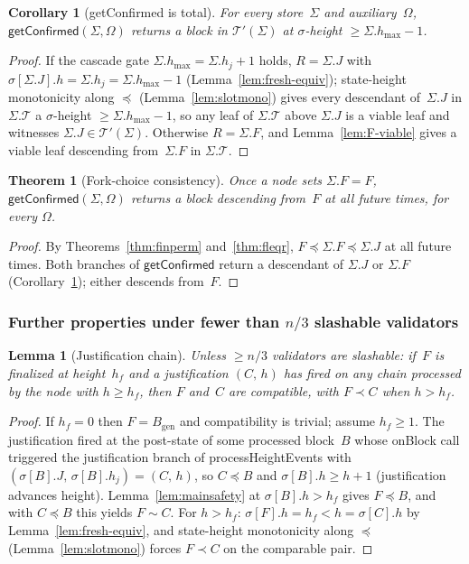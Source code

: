 \documentclass{article}
\newcommand{\genesis}{\ensuremath{B_{\mathrm{gen}}}}
\newcommand{\T}[0]{\ensuremath{\mathcal{T}}}
\newcommand{\hmax}{\ensuremath{h_{\max}}\xspace}
\newcommand{\viableTree}{\ensuremath{\mathcal{T}'}}
\newcommand{\processHeightEvents}{\textsf{processHeightEvents}\xspace}
\newcommand{\onBlock}{\textsf{onBlock}\xspace}
\newcommand{\getConfirmed}{\textsf{getConfirmed}\xspace}
\theoremstyle{plain}
\newtheorem{theorem}{Theorem}
\newtheorem{corollary}{Corollary}
\newtheorem{lemma}{Lemma}
\theoremstyle{definition}
\theoremstyle{remark}
\begin{document}
\begin{corollary}[\getConfirmed is total]\label{cor:getConfirmed-total}
For every store~$\Sigma$ and auxiliary~$\Omega$, $\getConfirmed(\Sigma, \Omega)$ returns a block in $\viableTree(\Sigma)$ at $\sigma$-height $\geq \Sigma.\hmax - 1$.
\end{corollary}

\begin{proof}
If the cascade gate $\Sigma.\hmax = \Sigma.h_j + 1$ holds, $R = \Sigma.J$ with $\sigma[\Sigma.J].h = \Sigma.h_j = \Sigma.\hmax - 1$ (Lemma~\ref{lem:fresh-equiv}); state-height monotonicity along $\preceq$ (Lemma~\ref{lem:slotmono}) gives every descendant of~$\Sigma.J$ in $\Sigma.\T$ a $\sigma$-height $\geq \Sigma.\hmax - 1$, so any leaf of $\Sigma.\T$ above $\Sigma.J$ is a viable leaf and witnesses $\Sigma.J \in \viableTree(\Sigma)$.
Otherwise $R = \Sigma.F$, and Lemma~\ref{lem:F-viable} gives a viable leaf descending from~$\Sigma.F$ in $\Sigma.\T$.
\end{proof}

\begin{theorem}[Fork-choice consistency]\label{thm:fcconsistency}
Once a node sets $\Sigma.F = F$, $\getConfirmed(\Sigma, \Omega)$ returns a block descending from~$F$ at all future times, for every $\Omega$.
\end{theorem}

\begin{proof}
By Theorems~\ref{thm:finperm} and~\ref{thm:fleqr}, $F \preceq \Sigma.F \preceq \Sigma.J$ at all future times.
Both branches of $\getConfirmed$ return a descendant of $\Sigma.J$ or $\Sigma.F$ (Corollary~\ref{cor:getConfirmed-total}); either descends from~$F$.
\end{proof}

\subsubsection*{Further properties under fewer than $n/3$ slashable validators}

\begin{lemma}[Justification chain]\label{lem:certchain}
Unless $\geq n/3$ validators are slashable: if~$F$ is finalized at height~$h_f$ and a justification $(C,\, h)$ has fired on any chain processed by the node with $h \geq h_f$, then $F$ and~$C$ are compatible, with $F \prec C$ when $h > h_f$.
\end{lemma}

\begin{proof}
If $h_f = 0$ then $F = \genesis$ and compatibility is trivial; assume $h_f \geq 1$.
The justification fired at the post-state of some processed block~$B$ whose \onBlock call triggered the justification branch of \processHeightEvents with $(\sigma[B].J,\, \sigma[B].h_j) = (C,\, h)$, so $C \preceq B$ and $\sigma[B].h \geq h + 1$ (justification advances height).
Lemma~\ref{lem:mainsafety} at $\sigma[B].h > h_f$ gives $F \preceq B$, and with $C \preceq B$ this yields $F \sim C$.
For $h > h_f$: $\sigma[F].h = h_f < h = \sigma[C].h$ by Lemma~\ref{lem:fresh-equiv}, and state-height monotonicity along $\preceq$ (Lemma~\ref{lem:slotmono}) forces $F \prec C$ on the comparable pair.
\end{proof}
\end{document}
